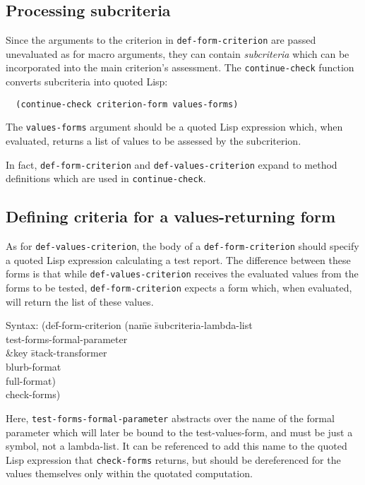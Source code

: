 \subsection{Processing subcriteria}
\label{sec:subcriteria}
Since the arguments to the criterion in \texttt{def-form-criterion}
are passed unevaluated as for macro arguments, they can contain
\emph{subcriteria} which can be incorporated into the main criterion's
assessment.  The \texttt{continue-check} function converts subcriteria
into quoted Lisp:
\begin{verbatim}
  (continue-check criterion-form values-forms)
\end{verbatim}
The \texttt{values-forms} argument should be a quoted Lisp expression
which, when evaluated, returns a list of values to be assessed by the
subcriterion.

In fact, \texttt{def-form-criterion} and \texttt{def-values-criterion}
expand to method definitions which are used in \texttt{continue-check}.

\subsection{Defining criteria for a values-returning form}
\label{sec:def-form-criterion}
As for \texttt{def-values-criterion}, the body of a
\texttt{def-form-criterion} should specify a quoted Lisp expression
calculating a test report.  The difference between these forms is that
while \texttt{def-values-criterion} receives the evaluated values from
the forms to be tested, \texttt{def-form-criterion} expects a form
which, when evaluated, will return the list of these values.
%
{\ttfamily\begin{tabbing}
\textrm{Syntax: 
}(de\=f-form-criterion (na\=me \=subcriteria-lambda-list
\\ \>\> \> test-forms-formal-parameter
\\ \>\> \&key \=stack-transformer
\\ \>\> \> blurb-format
\\ \>\> \> full-format)
\\ \> check-forms)
\end{tabbing}}
%
Here, \texttt{test-forms-formal-parameter} abstracts over the name of
the formal parameter which will later be bound to the
test-values-form, and must be just a symbol, not a lambda-list.  It
can be referenced to add this name to the quoted Lisp expression that
\texttt{check-forms} returns, but should be dereferenced for the
values themselves only within the quotated computation.

